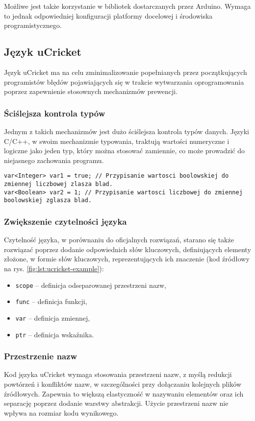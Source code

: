 Możliwe jest także korzystanie w bibliotek dostarczanych przez Arduino. Wymaga to jednak odpowiedniej konfiguracji platformy docelowej i środowiska programistycznego.

\subsection{Język uCricket}
Język uCricket ma na celu zminimalizowanie popełnianych przez początkujących programistów błędów pojawiających się w trakcie wytwarzania oprogramowania poprzez zapewnienie stosownych mechanizmów prewencji. 
\subsubsection{Ściślejsza kontrola typów}
Jednym z takich mechanizmów jest dużo ściślejsza kontrola typów danych. Języki C/C++, w swoim  mechanizmie typowania, traktują wartości numeryczne i logiczne jako jeden typ, który można stosować zamiennie, co może prowadzić do niejasnego zachowania programu. 

\begin{lstlisting}
var<Integer> var1 = true; // Przypisanie wartosci boolowskiej do zmiennej liczbowej zlasza blad.
var<Boolean> var2 = 1; // Przypisanie wartosci liczbowej do zmiennej boolowskiej zglasza blad.
\end{lstlisting}
\subsubsection{Zwiększenie czytelności języka}
Czytelność języka, w porównaniu do oficjalnych rozwiązań, starano się także rozwiązać poprzez dodanie odpowiednich słów kluczowych, definiujących elementy złożone, w formie słów kluczowych, reprezentujących ich znaczenie (kod źródłowy na rys. \ref{fig:lst:ucricket-example}):
\begin{itemize}
\item \lstinline|scope| -- definicja odseparowanej przestrzeni nazw,
\item \lstinline|func| -- definicja funkcji,
\item \lstinline|var| -- definicja zmiennej,
\item \lstinline|ptr| -- definicja wskaźnika.
\end{itemize}

\subsubsection{Przestrzenie nazw}
Kod języka uCricket wymaga stosowania przestrzeni nazw, z myślą redukcji powtórzeń i konfliktów nazw, w szczególności przy dołączaniu kolejnych plików źródłowych. Zapewnia to większą elastyczność w nazywaniu elementów oraz ich separację poprzez dodanie warstwy abstrakcji. Użycie przestrzeni nazw nie wpływa na rozmiar kodu wynikowego.

